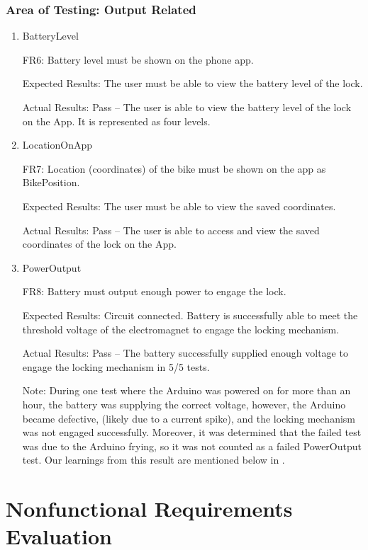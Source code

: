 \documentclass[12pt, titlepage]{article}
\begin{document}
\subsubsection{Area of Testing: Output Related}

\begin{enumerate}

\item{BatteryLevel

FR6: Battery level must be shown on the phone app. }

Expected Results: The user must be able to view the battery level of the lock.

Actual Results: Pass -- The user is able to view the battery level of the lock on the App. It is represented as four levels. 

\item{LocationOnApp

FR7: Location (coordinates) of the bike must be shown on the app as BikePosition.}

Expected Results: The user must be able to view the saved coordinates.

Actual Results: Pass -- The user is able to access and view the saved coordinates of the lock on the App.

\item{PowerOutput

FR8: Battery must output enough power to engage the lock. }

Expected Results: Circuit connected. Battery is successfully able to meet the threshold voltage of the electromagnet to engage the locking mechanism.  

Actual Results: Pass -- The battery successfully supplied enough voltage to engage the locking mechanism in 5/5 tests. 

Note: During one test where the Arduino was powered on for more than an hour, the battery was supplying the correct voltage, however, the Arduino became defective, (likely due to a current spike), and the locking mechanism was not engaged successfully. Moreover, it was determined that the failed test was due to the Arduino frying, so it was not counted as a failed PowerOutput test. Our learnings from this result are mentioned below in . 

\end{enumerate}

\section{Nonfunctional Requirements Evaluation}
\end{document}
